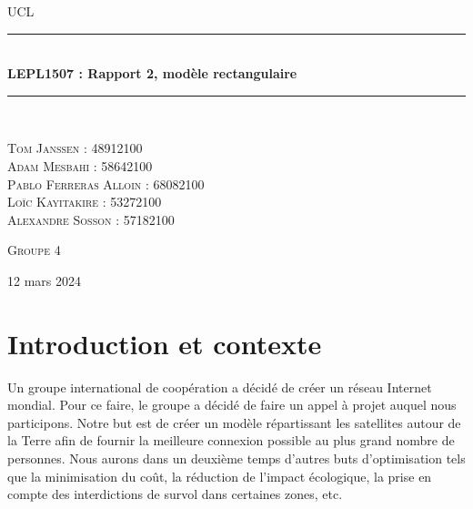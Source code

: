 \documentclass[a4paper]{article}
\newcommand{\HRule}{\rule{\linewidth}{0.5mm}}
\begin{document}
\begin{titlepage}
  \begin{sffamily}
  \begin{center}

    \textsc{\LARGE UCL}\\[0.6 cm]

    \HRule \\[0.4cm]
    { \huge \bfseries LEPL1507 : Rapport 2, modèle rectangulaire\\[0.4cm] }
    \HRule \\[1 cm]

    \begin{minipage}{0.4\textwidth}
      \begin{flushleft} \large
        \textsc{Tom Janssen : 48912100}\\
        \textsc{Adam Mesbahi : 58642100}\\
        \textsc{Pablo Ferreras Alloin : 68082100}\\
        \textsc{Loïc Kayitakire : 53272100}\\
        \textsc{Alexandre Sosson : 57182100}\\

      \end{flushleft}
    \end{minipage}
    \begin{minipage}{0.4\textwidth}
      \begin{flushright} \large
        \textsc{Groupe 4}\\ 
      \end{flushright}
    \end{minipage}

    \vfill


    {\large{} 12 mars 2024}

  \end{center}
  \end{sffamily}
\end{titlepage}



\section{Introduction et contexte}
Un groupe international de coopération a décidé de créer un réseau Internet mondial. Pour ce faire, le groupe a décidé de faire un appel à projet auquel nous participons. 
Notre but est de créer un modèle répartissant les satellites autour de la Terre afin de fournir la meilleure connexion possible au plus grand nombre de personnes. Nous aurons dans un deuxième temps d'autres buts d'optimisation tels que la minimisation du coût, la réduction de l'impact écologique, la prise en compte des interdictions de survol dans certaines zones, etc.
\end{document}
